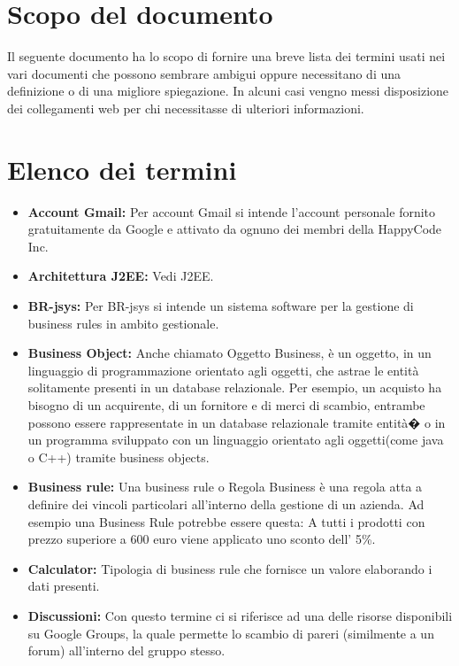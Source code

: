 \documentclass[11pt,titlepage,a4paper]{report}
\begin{document}
\tableofcontents	%

\chapter{Scopo del documento}
Il seguente documento ha lo scopo di fornire una breve lista dei termini usati nei vari documenti che possono sembrare ambigui oppure necessitano di una definizione o di una migliore spiegazione. In alcuni casi vengno messi disposizione dei collegamenti web per chi necessitasse di ulteriori informazioni.
\chapter{Elenco dei termini}
\begin{itemize}

\item{\textbf{Account Gmail:}
Per account Gmail si intende l'account personale fornito gratuitamente da Google e attivato da ognuno dei membri della HappyCode Inc.}

\item{\textbf{Architettura J2EE:}
Vedi J2EE.}

\item{\textbf{BR-jsys:}
Per BR-jsys si intende un sistema software per la gestione di business rules in ambito gestionale.}

\item{\textbf{Business Object:}
Anche chiamato Oggetto Business, \`e un oggetto, in un linguaggio di programmazione orientato agli oggetti, che astrae le entit\`a solitamente presenti in un database relazionale.
Per esempio, un acquisto ha bisogno di un acquirente, di un fornitore e di merci di scambio, entrambe possono essere rappresentate in un database relazionale tramite entit\`a� o in un programma sviluppato con un linguaggio orientato agli oggetti(come java o C++) tramite business objects.}

\item{\textbf{Business rule:}
Una business rule o Regola Business \`e una regola atta a definire dei vincoli particolari all'interno della gestione di un azienda. Ad esempio una Business Rule potrebbe essere questa: A tutti i prodotti con prezzo superiore a 600 euro  viene applicato uno sconto dell' 5\%.}

\item{\textbf{Calculator:}
Tipologia di business rule che fornisce un valore elaborando i dati presenti.}

\item{\textbf{Discussioni:}
Con questo termine ci si riferisce ad una delle risorse disponibili su Google Groups, la quale permette lo scambio di pareri (similmente a un forum) all'interno del gruppo stesso.}


\end{itemize}
\end{document}
